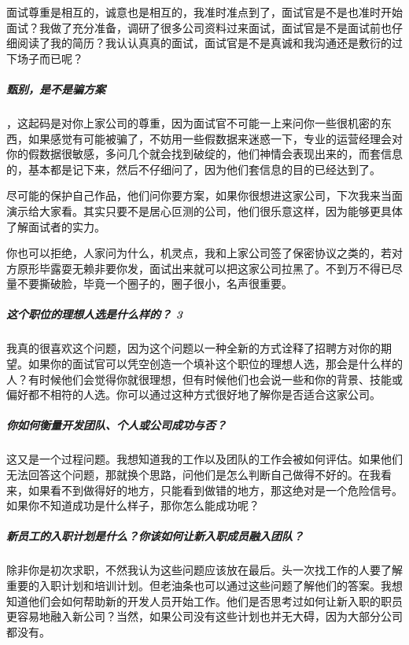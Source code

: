 \documentclass[letterpaper,11pt,english]{sphinxmanual}
\begin{document}
面试尊重是相互的，诚意也是相互的，我准时准点到了，面试官是不是也准时开始面试？我做了充分准备，调研了很多公司资料过来面试，面试官是不是面试前也仔细阅读了我的简历？我认认真真的面试，面试官是不是真诚和我沟通还是敷衍的过下场子而已呢？


\subparagraph{甄别，是不是骗方案}
\label{\detokenize{chapter_interview/interviewer:id11}}
，这起码是对你上家公司的尊重，因为面试官不可能一上来问你一些很机密的东西，如果感觉有可能被骗了，不妨用一些假数据来迷惑一下，专业的运营经理会对你的假数据很敏感，多问几个就会找到破绽的，他们神情会表现出来的，而套信息的，基本都是记下来，然后不仔细问了，因为他们套信息的目的已经达到了。

尽可能的保护自己作品，他们问你要方案，如果你很想进这家公司，下次我来当面演示给大家看。其实只要不是居心叵测的公司，他们很乐意这样，因为能够更具体了解面试者的实力。

你也可以拒绝，人家问为什么，机灵点，我和上家公司签了保密协议之类的，若对方原形毕露耍无赖非要你发，面试出来就可以把这家公司拉黑了。不到万不得已尽量不要撕破脸，毕竟一个圈子的，圈子很小，名声很重要。


\subparagraph{这个职位的理想人选是什么样的？ 3\sphinxfootnotemark[773]}
\label{\detokenize{chapter_interview/interviewer:id12}}%
\begin{footnotetext}[773]\sphinxAtStartFootnote
{}
%
\end{footnotetext}\ignorespaces 
我真的很喜欢这个问题，因为这个问题以一种全新的方式诠释了招聘方对你的期望。如果你的面试官可以凭空创造一个填补这个职位的理想人选，那会是什么样的人？有时候他们会觉得你就很理想，但有时候他们也会说一些和你的背景、技能或偏好都不相符的人选。你可以通过这种方式很好地了解你是否适合这家公司。


\subparagraph{你如何衡量开发团队、个人或公司成功与否？}
\label{\detokenize{chapter_interview/interviewer:id13}}
这又是一个过程问题。我想知道我的工作以及团队的工作会被如何评估。如果他们无法回答这个问题，那就换个思路，问他们是怎么判断自己做得不好的。在我看来，如果看不到做得好的地方，只能看到做错的地方，那这绝对是一个危险信号。如果你不知道成功是什么样子，那你怎么能成功呢？


\subparagraph{新员工的入职计划是什么？你该如何让新入职成员融入团队？}
\label{\detokenize{chapter_interview/interviewer:id14}}
除非你是初次求职，不然我认为这些问题应该放在最后。头一次找工作的人要了解重要的入职计划和培训计划。但老油条也可以通过这些问题了解他们的答案。我想知道他们会如何帮助新的开发人员开始工作。他们是否思考过如何让新入职的职员更容易地融入新公司？当然，如果公司没有这些计划也并无大碍，因为大部分公司都没有。
\end{document}
